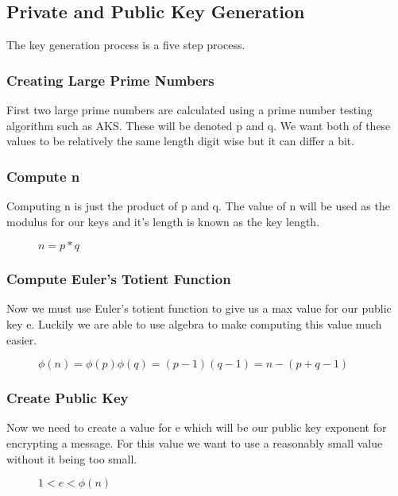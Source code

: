 \documentclass[conference]{IEEEtran}
\begin{document}
\subsection{Private and Public Key Generation}
The key generation process is a five step process. 

\subsubsection{Creating Large Prime Numbers}
First two large prime numbers are calculated using a prime number testing algorithm such as AKS. These will be denoted p and q. We want both of these values to be relatively the same length digit wise but it can differ a bit. 

\subsubsection{Compute n}
Computing n is just the product of p and q. The value of n will be used as the modulus for our keys and it's length is known as the key length.

\begin{figure}[h]
	\begin{center}
		$n=p * q$
	\end{center}
\end{figure}

\subsubsection{Compute Euler's Totient Function}
Now we must use Euler's totient function to give us a max value for our public key e.
Luckily we are able to use algebra to make computing this value much easier.
\begin{figure}[h]
	\begin{center}
		$\phi \left(n\right)=\phi \left(p\right)\phi \left(q\right)=\left(p-1\right)\left(q-1\right)=n-\left(p+q-1\right)$
	\end{center}
\end{figure}

\subsubsection{Create Public Key}
Now we need to create a value for e which will be our public key exponent for encrypting a message. For this value we want to use a reasonably small value without it being too small. 
\begin{figure}[h]
	\begin{center}
		$1 < e < \phi \left(n\right)$
	\end{center}
\end{figure}
\end{document}
